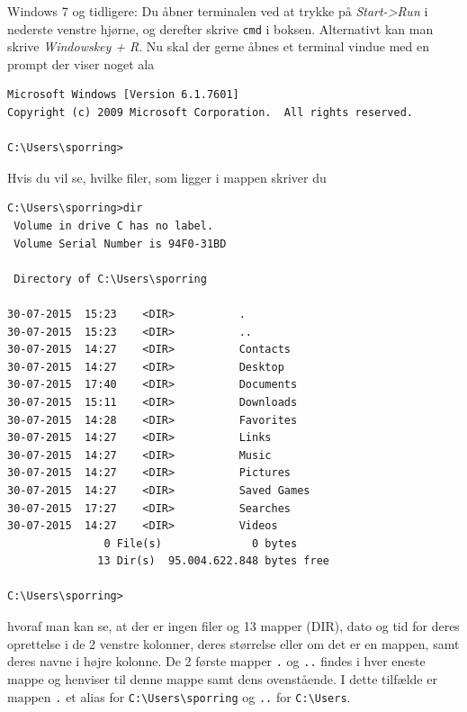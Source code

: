 \documentclass[a4paper]{article}
\begin{document}
Windows 7 og tidligere: Du åbner terminalen ved at trykke på \textit{Start->Run} i nederste venstre hjørne, og derefter skrive \verb|cmd| i boksen. Alternativt kan man skrive \textit{Windowskey + R}. Nu skal der gerne åbnes et terminal vindue med en prompt der viser noget ala
\begin{lstlisting}[frame=single]
Microsoft Windows [Version 6.1.7601]
Copyright (c) 2009 Microsoft Corporation.  All rights reserved.

C:\Users\sporring>
\end{lstlisting}
Hvis du vil se, hvilke filer, som ligger i mappen skriver du
\begin{lstlisting}[frame=single]
C:\Users\sporring>dir
 Volume in drive C has no label.
 Volume Serial Number is 94F0-31BD

 Directory of C:\Users\sporring

30-07-2015  15:23    <DIR>          .
30-07-2015  15:23    <DIR>          ..
30-07-2015  14:27    <DIR>          Contacts
30-07-2015  14:27    <DIR>          Desktop
30-07-2015  17:40    <DIR>          Documents
30-07-2015  15:11    <DIR>          Downloads
30-07-2015  14:28    <DIR>          Favorites
30-07-2015  14:27    <DIR>          Links
30-07-2015  14:27    <DIR>          Music
30-07-2015  14:27    <DIR>          Pictures
30-07-2015  14:27    <DIR>          Saved Games
30-07-2015  17:27    <DIR>          Searches
30-07-2015  14:27    <DIR>          Videos
               0 File(s)              0 bytes
              13 Dir(s)  95.004.622.848 bytes free

C:\Users\sporring>
\end{lstlisting}
hvoraf man kan se, at der er ingen filer og 13 mapper (DIR), dato og tid for deres oprettelse i de 2 venstre kolonner, deres størrelse eller om det er en mappen, samt deres navne i højre kolonne.  De 2 første mapper \verb|.| og \verb|..| findes i hver eneste mappe og henviser til denne mappe samt dens ovenstående. I dette tilfælde er mappen \verb|.| et alias for \verb|C:\Users\sporring| og \verb|..| for \verb|C:\Users|.
\end{document}
